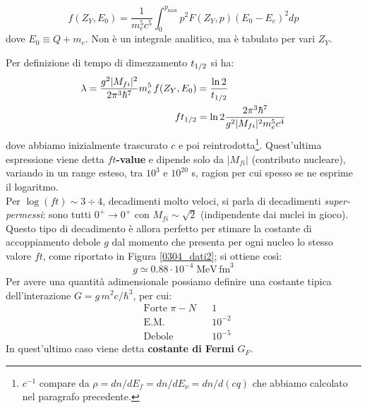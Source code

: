 \begin{definition}
$$f(Z_Y,E_0) = \frac{1}{m_e^5 c^5}\int_0^{p_{\max{}}} p^2 F(Z_Y,p)(E_0-E_e)^2 dp$$
dove $E_0\equiv Q + m_e$. Non è un integrale analitico, ma è tabulato per vari $Z_Y$.
\end{definition}
\noindent Per definizione di tempo di dimezzamento $t_{1/2}$ si ha:
\begin{displaymath}
\begin{aligned}
\lambda = \frac{g^2 |M_{fi}|^2}{2\pi^3 \hbar^7} m_e^5\, f(Z_Y,E_0) &= \frac{\ln{2}}{t_{1/2}} \\
ft_{1/2} &= \ln{2}\frac{2\pi^3 \hbar^7}{ g^2 |M_{fi}|^2 m_e^5 c^4} 
\end{aligned}
\end{displaymath}
dove abbiamo inizialmente trascurato $c$ e poi reintrodotta\footnote{$c^{-1}$ compare da $\rho = dn/dE_f = dn/dE_\nu = dn/d(cq)$ che abbiamo calcolato nel paragrafo precedente.}. Quest'ultima espressione viene detta $ft$\textbf{-value} e dipende solo da $|M_{fi}|$ (contributo nucleare), variando in un range esteso, tra $10^3$ e $10^{20}$ s, ragion per cui spesso se ne esprime il logaritmo.\\
Per $\log{(ft)}\sim 3 \div 4$, decadimenti molto veloci, si parla di decadimenti \textit{super-permessi}: sono tutti $0^+\to0^+$ con $M_{fi}\sim \sqrt{2}$ (indipendente dai nuclei in gioco). Questo tipo di decadimento è allora perfetto per stimare la costante di accoppiamento debole $g$ dal momento che presenta per ogni nucleo lo stesso valore $ft$, come riportato in Figura \ref{0304_dati2}; si ottiene così:
$$g\simeq 0.88\cdot 10^{-4} \;\mbox{MeV}\,\mbox{fm}^3$$
Per avere una quantità adimensionale possiamo definire una costante tipica dell'interazione $G = g \,m^2c/\hbar^3$, per cui:
\begin{displaymath}
\begin{aligned}
&\text{Forte } \pi-N & &1 \\
&\text{E.M. } & &10^{-2} \\
&\text{Debole } & &10^{-5} 
\end{aligned}
\end{displaymath}
In quest'ultimo caso viene detta \textbf{costante di Fermi} $G_F$.

